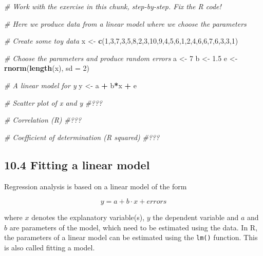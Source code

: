 \documentclass[]{article}
\newenvironment{Shaded}{\begin{snugshade}}{\end{snugshade}}
\newcommand{\CommentTok}[1]{\textcolor[rgb]{0.56,0.35,0.01}{\textit{#1}}}
\newcommand{\DataTypeTok}[1]{\textcolor[rgb]{0.13,0.29,0.53}{#1}}
\newcommand{\DecValTok}[1]{\textcolor[rgb]{0.00,0.00,0.81}{#1}}
\newcommand{\FloatTok}[1]{\textcolor[rgb]{0.00,0.00,0.81}{#1}}
\newcommand{\KeywordTok}[1]{\textcolor[rgb]{0.13,0.29,0.53}{\textbf{#1}}}
\newcommand{\NormalTok}[1]{#1}
\newcommand{\OperatorTok}[1]{\textcolor[rgb]{0.81,0.36,0.00}{\textbf{#1}}}
\newcommand{\StringTok}[1]{\textcolor[rgb]{0.31,0.60,0.02}{#1}}
\begin{document}
\begin{Shaded}
\begin{Highlighting}[]
\CommentTok{# Work with the exercise in this chunk, step-by-step. Fix the R code!}

\CommentTok{# Here we produce data from a linear model where we choose the parameters}

\CommentTok{# Create some toy data}
\NormalTok{x <-}\StringTok{ }\KeywordTok{c}\NormalTok{(}\DecValTok{1}\NormalTok{,}\DecValTok{3}\NormalTok{,}\DecValTok{7}\NormalTok{,}\DecValTok{3}\NormalTok{,}\DecValTok{5}\NormalTok{,}\DecValTok{8}\NormalTok{,}\DecValTok{2}\NormalTok{,}\DecValTok{3}\NormalTok{,}\DecValTok{10}\NormalTok{,}\DecValTok{9}\NormalTok{,}\DecValTok{4}\NormalTok{,}\DecValTok{5}\NormalTok{,}\DecValTok{6}\NormalTok{,}\DecValTok{1}\NormalTok{,}\DecValTok{2}\NormalTok{,}\DecValTok{4}\NormalTok{,}\DecValTok{6}\NormalTok{,}\DecValTok{6}\NormalTok{,}\DecValTok{7}\NormalTok{,}\DecValTok{6}\NormalTok{,}\DecValTok{3}\NormalTok{,}\DecValTok{3}\NormalTok{,}\DecValTok{1}\NormalTok{)}

\CommentTok{# Choose the parameters and produce random errors}
\NormalTok{a <-}\StringTok{ }\DecValTok{7}
\NormalTok{b <-}\StringTok{ }\FloatTok{1.5}
\NormalTok{e <-}\StringTok{ }\KeywordTok{rnorm}\NormalTok{(}\KeywordTok{length}\NormalTok{(x), }\DataTypeTok{sd =} \DecValTok{2}\NormalTok{)}

\CommentTok{# A linear model for y}
\NormalTok{y <-}\StringTok{ }\NormalTok{a }\OperatorTok{+}\StringTok{ }\NormalTok{b}\OperatorTok{*}\NormalTok{x }\OperatorTok{+}\StringTok{ }\NormalTok{e}

\CommentTok{# Scatter plot of x and y}
\CommentTok{#???}

\CommentTok{# Correlation (R)}
\CommentTok{#???}

\CommentTok{# Coefficient of determination (R squared)}
\CommentTok{#???}
\end{Highlighting}
\end{Shaded}

\hypertarget{fitting-a-linear-model}{%
\subsection{10.4 Fitting a linear model}\label{fitting-a-linear-model}}

Regression analysis is based on a linear model of the form

\[y = a + b \cdot x + errors\]

where \(x\) denotes the explanatory variable(s), \(y\) the dependent
variable and \(a\) and \(b\) are parameters of the model, which need to
be estimated using the data. In R, the parameters of a linear model can
be estimated using the \texttt{lm()} function. This is also called
fitting a model.
\end{document}

